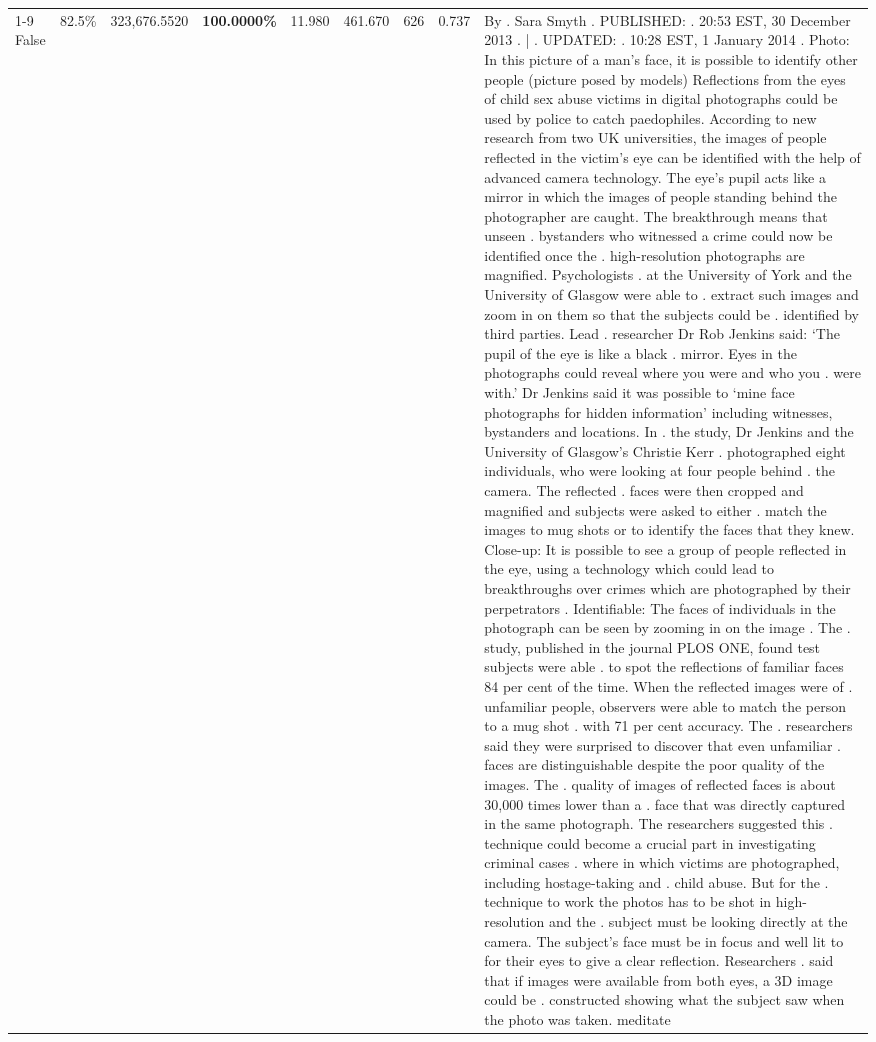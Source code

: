 \begin{table}[H]
\begin{tabular}{lllrlllll}
\cline{1-9}
False & 82.5\% & 323,676.5520 & \bfseries \color{red} 100.0000\% & 11.980 & 461.670 & 626 & 0.737 & By . Sara Smyth . PUBLISHED: . 20:53 EST, 30 December 2013 . | . UPDATED: . 10:28 EST, 1 January 2014 . Photo: In this picture of a man's face, it is possible to identify other people (picture posed by models) Reflections from the eyes of child sex abuse victims in digital photographs could be used by police to catch paedophiles. According to new research from two UK universities, the images of people reflected in the victim's eye can be identified with the help of advanced camera technology. The eye's pupil acts like a mirror in which the images of people standing behind the photographer are caught. The breakthrough means that unseen . bystanders who witnessed a crime could now be identified once the . high-resolution photographs are magnified. Psychologists . at the University of York and the University of Glasgow were able to . extract such images and zoom in on them so that the subjects could be . identified by third parties. Lead . researcher Dr Rob Jenkins said: ‘The pupil of the eye is like a black . mirror. Eyes in the photographs could reveal where you were and who you . were with.' Dr Jenkins said it was possible to ‘mine face photographs for hidden information' including witnesses, bystanders and locations. In . the study, Dr Jenkins and the University of Glasgow's Christie Kerr . photographed eight individuals, who were looking at four people behind . the camera. The reflected . faces were then cropped and magnified and subjects were asked to either . match the images to mug shots or to identify the faces that they knew. Close-up: It is possible to see a group of people reflected in the eye, using a technology which could lead to breakthroughs over crimes which are photographed by their perpetrators . Identifiable: The faces of individuals in the photograph can be seen by zooming in on the image . The . study, published in the journal PLOS ONE, found test subjects were able . to spot the reflections of familiar faces 84 per cent of the time. When the reflected images were of . unfamiliar people, observers were able to match the person to a mug shot . with 71 per cent accuracy. The . researchers said they were surprised to discover that even unfamiliar . faces are distinguishable despite the poor quality of the images. The . quality of images of reflected faces is about 30,000 times lower than a . face that was directly captured in the same photograph. The researchers suggested this . technique could become a crucial part in investigating criminal cases . where in which victims are photographed, including hostage-taking and . child abuse. But for the . technique to work the photos has to be shot in high-resolution and the . subject must be looking directly at the camera. The subject's face must be in focus and well lit to for their eyes to give a clear reflection. Researchers . said that if images were available from both eyes, a 3D image could be . constructed showing what the subject saw when the photo was taken. meditate \\

\end{tabular}
\end{table}
